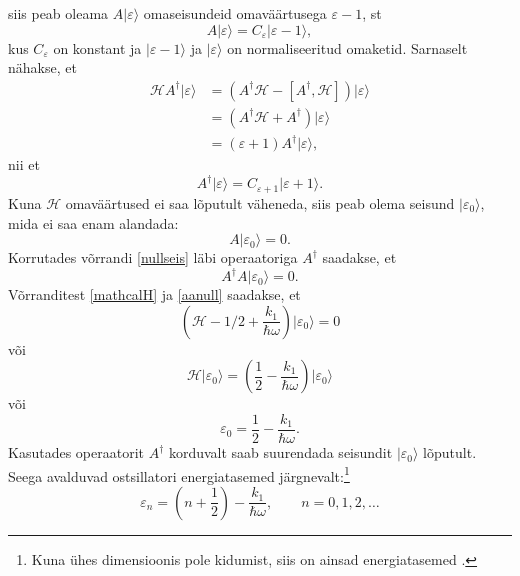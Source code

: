 \documentclass{trkut}%
\renewcommand\ket[1]{{|{#1}\rangle}}
\begin{document}
siis peab oleama $A\ket{\varepsilon}$ omaseisundeid omaväärtusega $\varepsilon - 1$, st
\begin{equation}
    A\ket{\varepsilon}=C_\varepsilon \ket{\varepsilon -1},
    \label{cepsilon}
\end{equation}
kus $C_\varepsilon$ on konstant ja $\ket{\varepsilon -1}$ ja $\ket{\varepsilon}$ on normaliseeritud omaketid.
Sarnaselt nähakse, et
\begin{align}
        \mathcal{H}A^\dagger\ket{\varepsilon}&=\left(A^\dagger\mathcal{H}-[A^\dagger, \mathcal{H}]\right)\ket{\varepsilon} \nonumber \\
        &=(A^\dagger\mathcal{H}+A^\dagger)\ket{\varepsilon} \nonumber \\
        &=(\varepsilon + 1)A^\dagger\ket{\varepsilon},
\end{align}
nii et
\begin{equation}
    A^\dagger\ket{\varepsilon}=C_{\varepsilon+1} \ket{\varepsilon+1}.
    \label{cepsilon1}
\end{equation}
Kuna $\mathcal{H}$ omaväärtused ei saa lõputult väheneda, siis peab olema seisund $\ket{\varepsilon_0}$, mida ei saa enam alandada:
\begin{equation}
    A\ket{\varepsilon_0}=0.
    \label{nullseis}
\end{equation}
Korrutades võrrandi \eqref{nullseis} läbi operaatoriga $A^\dagger$ saadakse, et
\begin{equation}
    A^\dagger A\ket{\varepsilon_0}=0.
    \label{aanull}
\end{equation}
Võrranditest \eqref{mathcalH} ja \eqref{aanull} saadakse, et
\begin{equation}
    \left(\mathcal{H}-1/2 + \frac{k_1}{\hbar \omega} \right)\ket{\varepsilon_0}=0
\end{equation}
või
\begin{equation}
    \mathcal{H}\ket{\varepsilon_0}=\left(\frac{1}{2} - \frac{k_1}{\hbar \omega}\right) \ket{\varepsilon_0}
\end{equation}
või
\begin{equation}
    \varepsilon_0=\frac{1}{2} - \frac{k_1}{\hbar \omega}.
\end{equation}
Kasutades operaatorit $A^\dagger$ korduvalt saab suurendada seisundit $\ket{\varepsilon_0}$ lõputult. Seega avalduvad ostsillatori energiatasemed järgnevalt:\footnote{Kuna ühes dimensioonis pole kidumist, siis on ainsad energiatasemed \parencite[176-177]{shankar94}.}
\begin{equation}
    \varepsilon_n=\left(n+\frac{1}{2}\right)-\frac{k_1}{\hbar \omega}, \qquad n=0, 1, 2,\dots
\end{equation}
\end{document}
